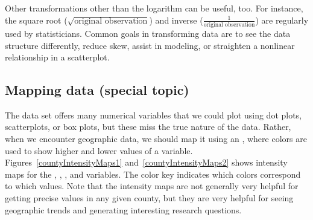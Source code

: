 Other transformations other than the logarithm can be useful, too. For instance, the square root ($\sqrt{\text{original observation}}$) and inverse ($\frac{1}{\text{original observation}}$) are regularly used by statisticians. Common goals in transforming data are to see the data structure differently, reduce skew, assist in modeling, or straighten a nonlinear relationship in a scatterplot.



\subsection{Mapping data (special topic)}


The  data set offers many numerical variables that we could plot using dot plots, scatterplots, or box plots, but these miss the true nature of the data. Rather, when we encounter geographic data, we should map it using an , where colors are used to show higher and lower values of a variable. Figures~\ref{countyIntensityMaps1} and~\ref{countyIntensityMaps2} shows intensity maps for the , , , and  variables. The color key indicates which colors correspond to which values. Note that the intensity maps are not generally very helpful for getting precise values in any given county, but they are very helpful for seeing geographic trends and generating interesting research questions.

